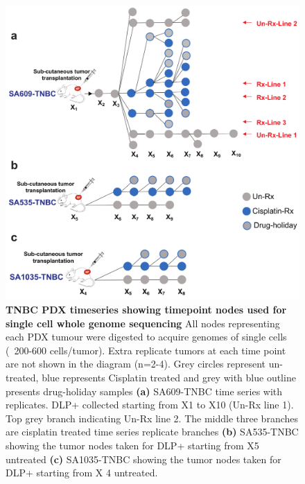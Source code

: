 \begin{figure}
\centering
\includegraphics[width=\textwidth]{Figures/treatedtimeseriesmanuscript.pdf}
  \caption[TNBC PDX timeseries clonal dynamics under drug perturbations]
	{\small
	\textbf{TNBC PDX timeseries showing timepoint nodes used for single cell whole genome sequencing}
	     All nodes representing each PDX tumour were digested to acquire genomes of single cells (~200-600 cells/tumor). Extra replicate tumors at each time point are not shown in the diagram (n=2-4). Grey circles represent un-treated, blue represents Cisplatin treated and grey with blue outline presents drug-holiday samples 
	     \textbf{(a)} SA609-TNBC time series with replicates. DLP+ collected starting from X1 to X10 (Un-Rx line 1). Top grey branch indicating Un-Rx line 2. The middle three branches are cisplatin treated time series replicate branches 
	     \textbf{(b)} SA535-TNBC  showing the tumor nodes taken for DLP+ starting from X5 untreated  \textbf{(c)} SA1035-TNBC  showing the tumor nodes taken for DLP+ starting from X 4 untreated.}
     \label{fig:treatedtimeseriesmanuscript}

\end{figure}




